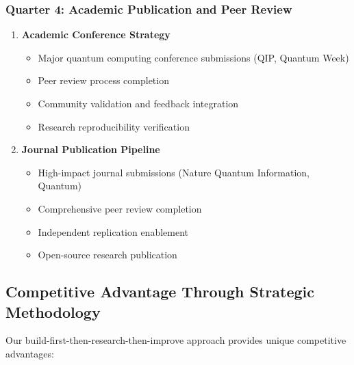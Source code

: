 \documentclass[12pt,a4paper]{article}
\begin{document}
\subsubsection{Quarter 4: Academic Publication and Peer Review}
\begin{enumerate}
    \item \textbf{Academic Conference Strategy}
    \begin{itemize}
        \item Major quantum computing conference submissions (QIP, Quantum Week)
        \item Peer review process completion
        \item Community validation and feedback integration
        \item Research reproducibility verification
    \end{itemize}
    
    \item \textbf{Journal Publication Pipeline}
    \begin{itemize}
        \item High-impact journal submissions (Nature Quantum Information, Quantum)
        \item Comprehensive peer review completion
        \item Independent replication enablement
        \item Open-source research publication
    \end{itemize}
\end{enumerate}

\subsection{Competitive Advantage Through Strategic Methodology}

Our build-first-then-research-then-improve approach provides unique competitive advantages:
\end{document}
